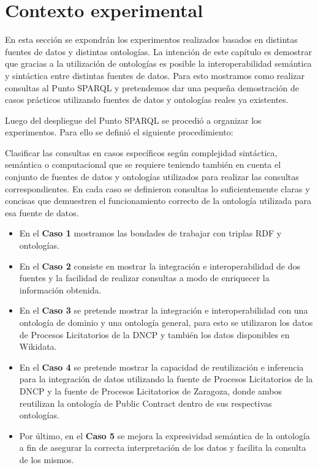 \chapter{Contexto experimental}
\label{chap:Contexto experimental}


En esta sección se expondrán los experimentos realizados basados en distintas fuentes de datos y distintas ontologías. La intención de este capítulo es demostrar que gracias a la utilización de ontologías es posible la interoperabilidad semántica y sintáctica entre distintas fuentes de datos. Para esto mostramos como realizar consultas al Punto SPARQL y pretendemos dar una pequeña demostración de casos prácticos utilizando fuentes de datos y ontologías reales ya existentes. 

Luego del despliegue del Punto SPARQL se procedió a organizar los experimentos. Para ello se definió el siguiente procedimiento:

Clasificar las consultas en casos específicos según complejidad sintáctica, semántica o computacional que se requiere teniendo también en cuenta el conjunto de fuentes de datos y ontologías utilizados para realizar las consultas correspondientes.
En cada caso se definieron consultas lo suficientemente claras y concisas que demuestren el funcionamiento correcto de la ontología utilizada para esa fuente de datos.

\begin{itemize}
    \item En el \textbf{Caso 1} mostramos las bondades de trabajar con triplas RDF y ontologías.
    \item  En el \textbf{Caso 2} consiste en mostrar la integración e interoperabilidad de dos fuentes y la facilidad de realizar consultas a modo de enriquecer la información obtenida.
    \item En el \textbf{Caso 3} se pretende mostrar la integración e interoperabilidad con una ontología de dominio y una ontología general, para esto se utilizaron los datos de Procesos Licitatorios de la DNCP y también los datos disponibles en Wikidata.
    \item En el \textbf{Caso 4} se pretende mostrar la capacidad de reutilización e inferencia para la integración de datos utilizando la fuente de Procesos Licitatorios de la DNCP y la fuente de Procesos Licitatorios de Zaragoza, donde ambos reutilizan la ontología de Public Contract dentro de sus respectivas ontologías.
    \item Por último, en el \textbf{Caso 5} se mejora la expresividad semántica de la ontología a fin de asegurar la correcta interpretación de los datos y facilita la consulta de los mismos.
\end{itemize}
  

